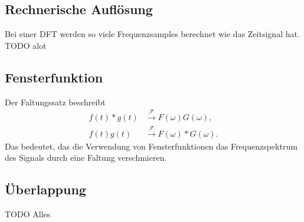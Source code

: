\subsection{Rechnerische Auflösung}
Bei einer DFT werden so viele Frequenzsamples berechnet wie das
Zeitsignal hat. 
TODO alot

\subsection{Fensterfunktion}
Der Faltungssatz beschreibt 
\begin{align}
    f(t) * g(t)& \xrightarrow{\mathscr{F}} F(\omega)G(\omega),\\
    f(t) g(t)&\xrightarrow{\mathscr{F}}F(\omega) * G(\omega).
\end{align}
Das bedeutet, das die Verwendung von Fensterfunktionen das Frequenzspektrum
des Signals durch eine Faltung verschmieren.
\subsection{Überlappung}
TODO Alles


